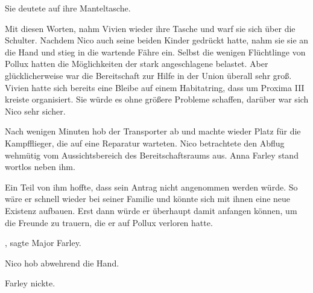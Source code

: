 \par

Sie deutete auf ihre Manteltasche. 

\par

Mit diesen Worten, nahm Vivien wieder ihre Tasche und warf sie sich über die Schulter. Nachdem Nico auch seine beiden Kinder gedrückt hatte, nahm sie sie an die Hand und stieg in die wartende Fähre ein. Selbst die wenigen Flüchtlinge von Pollux hatten die Möglichkeiten der stark angeschlagene  belastet. Aber glücklicherweise war die Bereitschaft zur Hilfe in der Union überall sehr groß. Vivien hatte sich bereits eine Bleibe auf einem Habitatring, dass um Proxima III kreiste organisiert. Sie würde es ohne größere Probleme schaffen, darüber war sich Nico sehr sicher.

\par

Nach wenigen Minuten hob der Transporter ab und machte wieder Platz für die Kampfflieger, die auf eine Reparatur warteten. Nico betrachtete den Abflug wehmütig vom Aussichtsbereich des Bereitschaftsraums aus. Anna Farley stand wortlos neben ihm.

\par

Ein Teil von ihm hoffte, dass sein Antrag nicht angenommen werden würde. So wäre er schnell wieder bei seiner Familie und könnte sich mit ihnen eine neue Existenz aufbauen. Erst dann würde er überhaupt damit anfangen können, um die Freunde zu trauern, die er auf Pollux verloren hatte.

\par

, sagte Major Farley. 

\par

Nico hob abwehrend die Hand. 

\par

Farley nickte. 

